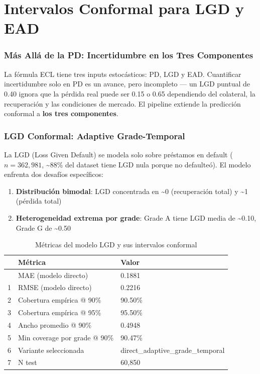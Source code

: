 \documentclass[
  spanish,
  11pt,
  letterpaper,
]{scrbook}
\providecommand{\tightlist}{%
  \setlength{\itemsep}{0pt}\setlength{\parskip}{0pt}}
\theoremstyle{plain}
\theoremstyle{remark}
\begin{document}
\chapter{Intervalos Conformal para LGD y
EAD}\label{sec-lgd-ead-conformal}

\subsection{Más Allá de la PD: Incertidumbre en los Tres
Componentes}\label{muxe1s-alluxe1-de-la-pd-incertidumbre-en-los-tres-componentes}

La fórmula ECL tiene tres inputs estocásticos: PD, LGD y EAD.
Cuantificar incertidumbre solo en PD es un avance, pero incompleto ---
un LGD puntual de 0.40 ignora que la pérdida real puede ser 0.15 o 0.65
dependiendo del colateral, la recuperación y las condiciones de mercado.
El pipeline extiende la predicción conformal a \textbf{los tres
componentes}.

\subsection{LGD Conformal: Adaptive
Grade-Temporal}\label{sec-lgd-conformal}

La LGD (Loss Given Default) se modela solo sobre préstamos en default
(\(n = 362{,}981\), \textasciitilde88\% del dataset tiene LGD nula
porque no defaulteó). El modelo enfrenta dos desafíos específicos:

\begin{enumerate}
\def\labelenumi{\arabic{enumi}.}
\tightlist
\item
  \textbf{Distribución bimodal}: LGD concentrada en \textasciitilde0
  (recuperación total) y \textasciitilde1 (pérdida total)
\item
  \textbf{Heterogeneidad extrema por grade}: Grade A tiene LGD media de
  \textasciitilde0.10, Grade G de \textasciitilde0.50
\end{enumerate}

{

\begin{longtable}[]{@{}lll@{}}

\caption{\label{tbl-lgd-conformal}Métricas del modelo LGD y sus
intervalos conformal}

\tabularnewline

\toprule\noalign{}
& Métrica & Valor \\
\midrule\noalign{}
\endhead
\bottomrule\noalign{}
\endlastfoot
0 & MAE (modelo directo) & 0.1881 \\
1 & RMSE (modelo directo) & 0.2216 \\
2 & Cobertura empírica @ 90\% & 90.50\% \\
3 & Cobertura empírica @ 95\% & 95.50\% \\
4 & Ancho promedio @ 90\% & 0.4948 \\
5 & Min coverage por grade @ 90\% & 90.47\% \\
6 & Variante seleccionada & direct\_adaptive\_grade\_temporal \\
7 & N test & 60,850 \\

\end{longtable}

}
\end{document}
